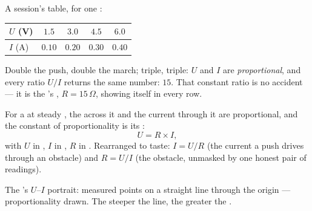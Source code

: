 \begin{example}\label{ex:g8:ohms-law:confession}
A session's table, for one :
\begin{center}
\begin{tabular}{l|cccc}
$U$ (\unit{V}) & $1.5$ & $3.0$ & $4.5$ & $6.0$ \\
\hline
$I$ (\unit{A}) & $0.10$ & $0.20$ & $0.30$ & $0.40$
\end{tabular}
\end{center}
Double the push, double the march; triple, triple: $U$ and $I$
are \emph{proportional}, and every ratio $U/I$ returns the same
number: $15$. That constant ratio is no accident --- it is the
's , $R = 15\,\Omega$, showing itself in
every row.
\end{example}

\begin{proposition}\label{prop:g8:ohms-law:law}
For a  at steady , the  across it
and the current through it are proportional, and the constant
of proportionality is its :
\[
U = R \times I ,
\]
with $U$ in , $I$ in , $R$ in . Rearranged to
taste: $I = U/R$ (the current a push drives through an
obstacle) and $R = U/I$ (the obstacle, unmasked by one honest
pair of readings).
\end{proposition}

\begin{omfigure}

{\small The 's $U$--$I$ portrait: measured points on a
straight line through the origin --- proportionality drawn.
The steeper the line, the greater the .}
\end{omfigure}


